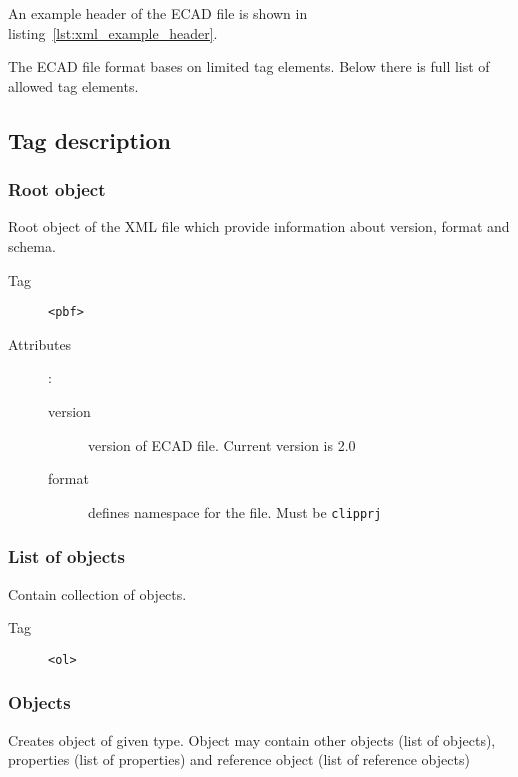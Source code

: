 \documentclass[%
	a4paper,
	oneside,
	listof=numbered,
	parskip=half,
	headsepline=true,
	footsepline=false,
	0.7headlines,
	]{scrbook}
\begin{document}
An example header of the ECAD file is shown in listing~\ref{lst:xml_example_header}.



The ECAD file format bases on limited tag elements.
Below there is full list of allowed tag elements.

\subsection{Tag description}

\subsubsection{Root object}

Root object of the XML file which provide information about version, format and schema.

\begin{description}
	\item[Tag] \verb|<pbf>|
	\item[Attributes]:
	
	\begin{description}
		\item[version] version of ECAD file.
		Current version is 2.0
		\item[format] defines namespace for the file.
		Must be \verb|clipprj|
	\end{description}
\end{description}

\subsubsection{List of objects}

Contain collection of objects.

\begin{description}
	\item[Tag] \verb|<ol>|
\end{description}

\subsubsection{Objects}

Creates object of given type.
Object may contain other objects (list of objects), properties (list of properties) and reference object (list of reference objects)
\end{document}
